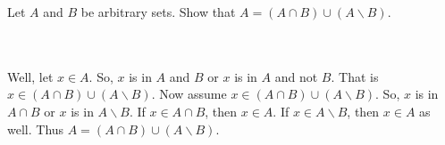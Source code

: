 Let $A$ and $B$ be arbitrary sets. Show that $A=(A\cap B)\cup (A\backslash B)$.\\\\

\begin{solution}\renewcommand{\qedsymbol}{}\ \\
    Well, let $x\in A$. So, $x$ is in $A$ and $B$ or $x$ is in $A$ and not $B$. That is
    $x\in (A\cap B)\cup(A\backslash B)$. Now assume $x\in (A\cap B)\cup(A\backslash B)$. So, $x$ is in
    $A\cap B$ or $x$ is in $A\backslash B$. If $x\in A\cap B$, then $x\in A$. If $x\in A\backslash B$,
    then $x\in A$ as well. Thus $A=(A\cap B)\cup (A\backslash B)$.

\end{solution}